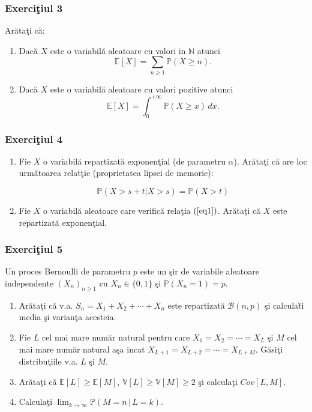 \documentclass[]{article}
\providecommand{\tightlist}{%
  \setlength{\itemsep}{0pt}\setlength{\parskip}{0pt}}
\def\a{{\alpha}}
\def\PP{{\mathbb P}}
\def\EE{{\mathbb E}}
\def\VV{{\mathbb V}}
\def\NN{{\mathbb N}}
\def\MB{{\mathcal B}}
\begin{document}
\subsubsection{\texorpdfstring{Exerci\c tiul
3}{Exerciiul 3}}\label{exerciiul-3}

Ar\u ata\c ti c\u a:

\begin{enumerate}
\def\labelenumi{\alph{enumi})}
\item
  Dac\u a \(X\) este o variabil\u a aleatoare cu valori in \(\NN\)
  atunci \[
    \EE[X] = \displaystyle\sum_{n\geq 1}\PP(X\geq n).
  \]
\item
  Dac\u a \(X\) este o variabil\u a aleatoare cu valori pozitive atunci
  \[
    \EE[X] = \displaystyle\int_{0}^{+\infty}\PP(X\geq x)\, dx.
  \]
\end{enumerate}

\subsubsection{\texorpdfstring{Exerci\c tiul
4}{Exerciiul 4}}\label{exerciiul-4}

\begin{enumerate}
\def\labelenumi{\alph{enumi})}
\tightlist
\item
  Fie \(X\) o variabil\u a repartizat\u a exponen\c tial (de parametru
  \(\a\)). Ar\u ata\c ti c\u a are loc urm\u atoarea relat\c tie
  (proprietatea lipsei de memorie):

  \begin{equation}\label{eq1}
    \PP(X>s+t|X>s) = \PP(X>t) 
  \end{equation}
\item
  Fie \(X\) o variabil\u a aleatoare care verific\u a rela\c tia
  \((\ref{eq1})\). Ar\u ata\c ti c\u a \(X\) este repartizat\u a
  exponen\c tial.
\end{enumerate}

\subsubsection{\texorpdfstring{Exerci\c tiul
5}{Exerciiul 5}}\label{exerciiul-5}

Un proces Bernoulli de parametru \(p\) este un \c sir de variabile
aleatoare independente \((X_n)_{n\geq1}\) cu \(X_n\in\{0,1\}\) \c si
\(\PP(X_n=1)=p\).

\begin{enumerate}
\def\labelenumi{\alph{enumi})}
\item
  Ar\u ata\c ti c\u a v.a. \(S_n=X_1+X_2+\cdots+X_n\) este
  repartizat\u a \(\MB(n,p)\) \c si calcula\u ti media \c si varian\c ta
  acesteia.
\item
  Fie \(L\) cel mai mare num\u ar natural pentru care
  \(X_1=X_2=\cdots=X_L\) \c si \(M\) cel mai mare num\u ar natural
  a\c sa incat \(X_{L+1}=X_{L+2}=\cdots=X_{L+M}\). G\u asi\c ti
  distribu\c tiile v.a. \(L\) \c si \(M\).
\item
  Ar\u ata\c ti c\u a \(\EE[L]\geq\EE[M]\), \(\VV[L]\geq\VV[M]\geq2\)
  \c si calcula\c ti \(Cov[L,M]\).
\item
  Calcula\c ti \(\displaystyle\lim_{k\to\infty}\PP(M=n\,|\,L=k)\).
\end{enumerate}
\end{document}
